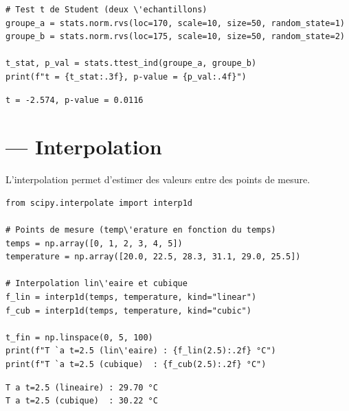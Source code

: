 \begin{codeblock}[title=\textbf{Python}]
\begin{verbatim}
# Test t de Student (deux \'echantillons)
groupe_a = stats.norm.rvs(loc=170, scale=10, size=50, random_state=1)
groupe_b = stats.norm.rvs(loc=175, scale=10, size=50, random_state=2)

t_stat, p_val = stats.ttest_ind(groupe_a, groupe_b)
print(f"t = {t_stat:.3f}, p-value = {p_val:.4f}")
\end{verbatim}
\end{codeblock}

\begin{codeoutput}
\begin{verbatim}
t = -2.574, p-value = 0.0116
\end{verbatim}
\end{codeoutput}

\section{ --- Interpolation}

L'interpolation permet d'estimer des valeurs entre des points de mesure.

\begin{codeblock}[title=\textbf{Python}]
\begin{verbatim}
from scipy.interpolate import interp1d

# Points de mesure (temp\'erature en fonction du temps)
temps = np.array([0, 1, 2, 3, 4, 5])
temperature = np.array([20.0, 22.5, 28.3, 31.1, 29.0, 25.5])

# Interpolation lin\'eaire et cubique
f_lin = interp1d(temps, temperature, kind="linear")
f_cub = interp1d(temps, temperature, kind="cubic")

t_fin = np.linspace(0, 5, 100)
print(f"T `a t=2.5 (lin\'eaire) : {f_lin(2.5):.2f} °C")
print(f"T `a t=2.5 (cubique)  : {f_cub(2.5):.2f} °C")
\end{verbatim}
\end{codeblock}

\begin{codeoutput}
\begin{verbatim}
T a t=2.5 (lineaire) : 29.70 °C
T a t=2.5 (cubique)  : 30.22 °C
\end{verbatim}
\end{codeoutput}

